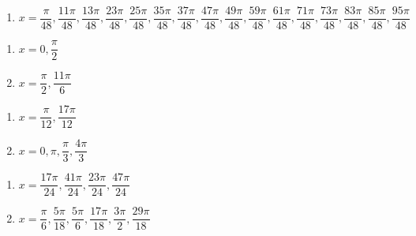 \begin{enumerate}

\setcounter{enumi}{\value{HW}}

\item $x = \dfrac{\pi}{48}, \dfrac{11\pi}{48}, \dfrac{13\pi}{48}, \dfrac{23\pi}{48}, \dfrac{25\pi}{48}, \dfrac{35\pi}{48}, \dfrac{37\pi}{48}, \dfrac{47\pi}{48}, \dfrac{49\pi}{48}, \dfrac{59\pi}{48}, \dfrac{61\pi}{48}, \dfrac{71\pi}{48}, \dfrac{73\pi}{48}, \dfrac{83\pi}{48}, \dfrac{85\pi}{48}, \dfrac{95\pi}{48}$

\setcounter{HW}{\value{enumi}}

\end{enumerate}

\begin{multicols}{2}

\begin{enumerate}

\setcounter{enumi}{\value{HW}}

\item $x = 0, \dfrac{\pi}{2}$ 
\item  $x = \dfrac{\pi}{2}, \dfrac{11\pi}{6}$

\setcounter{HW}{\value{enumi}}

\end{enumerate}

\end{multicols}

\begin{multicols}{2}

\begin{enumerate}

\setcounter{enumi}{\value{HW}}

\item  $x = \dfrac{\pi}{12}, \dfrac{17\pi}{12}$
\item  $x= 0, \pi, \dfrac{\pi}{3}, \dfrac{4\pi}{3}$

\setcounter{HW}{\value{enumi}}

\end{enumerate}

\end{multicols}

\begin{multicols}{2}

\begin{enumerate}

\setcounter{enumi}{\value{HW}}

\item  $x = \dfrac{17 \pi}{24}, \dfrac{41 \pi}{24}, \dfrac{23\pi}{24}, \dfrac{47\pi}{24}$
\item $x = \dfrac{\pi}{6}, \dfrac{5\pi}{18}, \dfrac{5\pi}{6}, \dfrac{17\pi}{18}, \dfrac{3\pi}{2}, \dfrac{29\pi}{18}$

\setcounter{HW}{\value{enumi}}

\end{enumerate}

\end{multicols}

